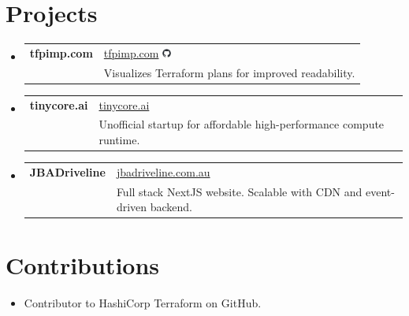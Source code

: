 \section*{Projects}
\begin{itemize}[leftmargin=0.15in, label={}]
  \item{
    \begin{tabular}{p{4.5cm} p{12cm}}
      \textbf{tfpimp.com} & \href{https://tfpimp.com}{tfpimp.com} \hspace{1em} \href{https://github.com/christophersherman/tfpimp.com}{\includegraphics[height=0.8em]{github.png}} \\
      & \small Visualizes Terraform plans for improved readability. \\
    \end{tabular}
  }
  \item{
    \begin{tabular}{p{4.5cm} p{12cm}}
      \textbf{tinycore.ai} & \href{https://tinycore.ai}{tinycore.ai} \hspace{1em} \\
      & \small Unofficial startup for affordable high-performance compute runtime. \\
    \end{tabular}
  }
  \item{
    \begin{tabular}{p{4.5cm} p{12cm}}
      \textbf{JBADriveline} & \href{https://www.jbadriveline.com.au/}{jbadriveline.com.au} \hspace{1em} \\
      & \small Full stack NextJS website. Scalable with CDN and event-driven backend.  \\
    \end{tabular}
  }
\end{itemize}

\section*{Contributions}
\begin{itemize}[leftmargin=0.15in, label={}]
  \item{Contributor to HashiCorp Terraform on GitHub.}
\end{itemize}
